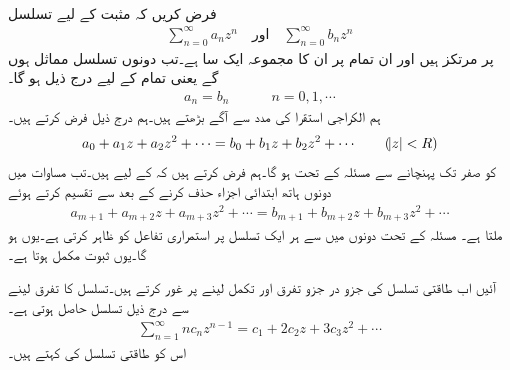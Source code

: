 \quad {}\\
فرض کریں کہ مثبت  کے لیے تسلسل
\begin{align*}
\sum\limits_{n=0}^{\infty} a_n z^n \quad \text{اور}\quad \sum\limits_{n=0}^{\infty} b_n z^n
\end{align*}
 پر مرتکز ہیں اور ان تمام  پر ان کا مجموعہ ایک سا ہے۔تب دونوں تسلسل مماثل ہوں گے یعنی تمام  کے لیے درج ذیل ہو گا۔
\begin{align}
a_n=b_n\quad \quad \quad n=0,1,\cdots
\end{align}
\quad
ہم الکراجی استقرا کی مدد سے آگے بڑھتے ہیں۔ہم درج ذیل فرض کرتے ہیں۔
\begin{align}\label{مساوات_ٹیلر_مسئلہ_مماثلت_الف}
a_0+a_1z+a_2z^2+\cdots=b_0+b_1z+b_2z^2+\cdots\quad \quad (\abs{z}<R)
\end{align}
 کو صفر تک پہنچانے سے مسئلہ  کے تحت  ہو گا۔ہم فرض کرتے ہیں کہ  کے لیے  ہیں۔تب مساوات  میں دونوں ہاتھ ابتدائی  اجزاء حذف کرنے کے بعد  سے تقسیم کرتے ہوئے
\begin{align*}
a_{m+1}+a_{m+2}z+a_{m+3}z^2+\cdots=b_{m+1}+b_{m+2}z+b_{m+3}z^2+\cdots
\end{align*}
ملتا ہے۔ مسئلہ  کے تحت دونوں میں سے ہر ایک تسلسل  پر استمراری تفاعل کو ظاہر کرتی ہے۔یوں  ہو گا۔یوں ثبوت مکمل ہوتا ہے۔

آئیں اب طاقتی تسلسل کی جزو در جزو تفرق اور تکمل لینے پر غور کرتے ہیں۔تسلسل  کا تفرق لینے سے درج ذیل تسلسل حاصل ہوتی ہے۔
\begin{align}\label{مساوات_ٹیلر_تفرقی_تسلسل}
\sum\limits_{n=1}^{\infty} nc_nz^{n-1}=c_1+2c_2z+3c_3z^2+\cdots
\end{align}
اس کو طاقتی تسلسل کی  کہتے ہیں۔

